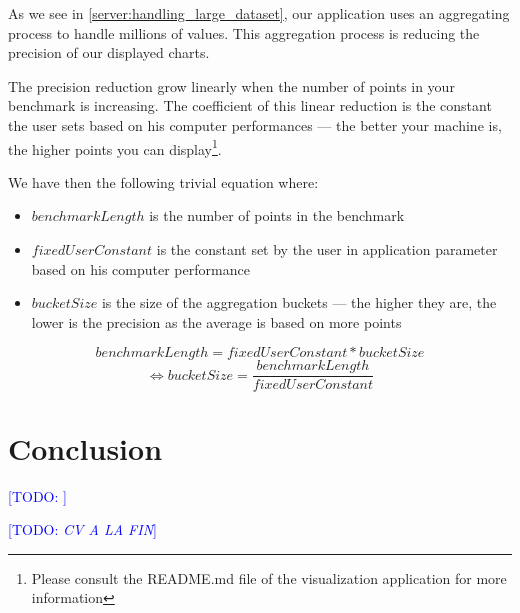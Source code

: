 \documentclass[a4paper,11pt]{report}
\newcommand*{\todo}[1]{\textcolor{blue}{[TODO: \emph{#1}]}}
\begin{document}
As we see in \ref{server:handling_large_dataset}, our application uses an aggregating process to handle millions of values. This aggregation process is reducing the precision of our displayed charts.

The precision reduction grow linearly when the number of points in your benchmark is increasing. The coefficient of this linear reduction is the constant the user sets based on his computer performances --- the better your machine is, the higher points you can display\footnote{Please consult the README.md file of the visualization application for more information}. 

We have then the following trivial equation where: 
\begin{itemize}
\item
$benchmarkLength$ is the number of points in the benchmark
\item
$fixedUserConstant$ is the constant set by the user in application parameter based on his computer performance
\item
$bucketSize$ is the size of the aggregation buckets --- the higher they are, the lower is the precision as the average is based on more points
\end{itemize}

$$ benchmarkLength = fixedUserConstant * bucketSize $$
$$\Longleftrightarrow bucketSize = \frac{benchmarkLength}{fixedUserConstant} $$

\clearpage

\chapter*{Conclusion}

\todo{}

\todo{CV A LA FIN}
\clearpage




\clearpage



\newpage

\end{document}
